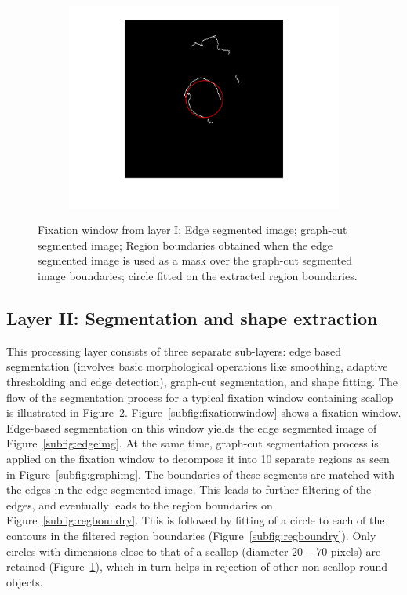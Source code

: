 \documentclass {udthesis}
\begin{document}
\begin{figure}
\begin{subfigure}[]{0.17\textwidth}
      \includegraphics[width=\textwidth,natwidth=810,natheight=813]{regcircle.pdf}         
      \caption{}
      \label{subfig:regcircle}
  \end{subfigure}
\caption{ Fixation window from layer I;  Edge segmented image;  graph-cut segmented image;  Region boundaries obtained when the edge segmented image is used as a mask over the graph-cut segmented image boundaries;  circle fitted on the extracted region boundaries.
}
\label{fig:segmentation_levels}
\end{figure}


\subsection{Layer II: Segmentation and shape extraction}
\label{subsec:layer2}

This processing layer consists of
three separate sub-layers: edge based segmentation (involves basic morphological 
operations like smoothing, adaptive thresholding and edge detection), graph-cut 
segmentation, and shape fitting. 
The flow of the segmentation process for a typical fixation window containing  scallop is illustrated in Figure~\ref{fig:segmentation_levels}. 
Figure~\ref{subfig:fixationwindow} shows a fixation window.
Edge-based segmentation on this window yields the edge segmented image of Figure~\ref{subfig:edgeimg}.
At the same time, graph-cut segmentation process \cite{shi} is applied on the 
fixation window to decompose it into 10 separate regions
as seen in Figure~\ref{subfig:graphimg}. The boundaries of these
segments are matched with the edges in the edge segmented image.
This leads to further filtering of the edges, and eventually leads to the region boundaries
on Figure~\ref{subfig:regboundry}.
This is followed by fitting of a circle to 
each of the contours in the filtered region boundaries (Figure~\ref{subfig:regboundry}). 
Only circles with dimensions close to that of a scallop (diameter $20 - 70$ pixels) 
are retained (Figure~\ref{subfig:regcircle}), which in turn helps in rejection of other 
non-scallop round objects.
\end{document}
